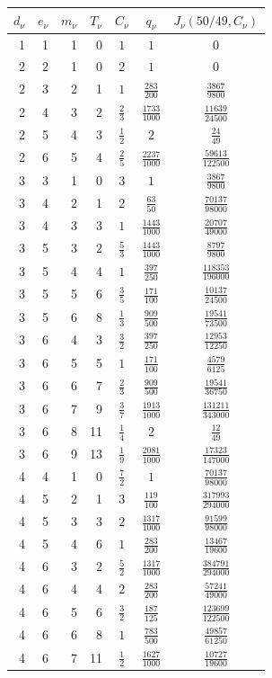 \begin{center}
\small
\begin{tabular}{rrrrccc}
\(d_\nu\)&\(e_\nu\)&\(m_\nu\)&\(T_\nu\)&\(C_\nu\)&\(q_\nu\)&
\(J_\nu(50/49,C_\nu)\)\\ \hline
1&1&1&0&\(1\)&\(1\)&\(0\)\\
2&2&1&0&\(2\)&\(1\)&\(0\)\\
2&3&2&1&\(1\)&\(\frac{283}{200}\)&\(\frac{3867}{9800}\)\\
2&4&3&2&\(\frac{2}{3}\)&\(\frac{1733}{1000}\)&\(\frac{11639}{24500}\)\\
2&5&4&3&\(\frac{1}{2}\)&\(2\)&\(\frac{24}{49}\)\\
2&6&5&4&\(\frac{2}{5}\)&\(\frac{2237}{1000}\)&\(\frac{59613}{122500}\)\\
3&3&1&0&\(3\)&\(1\)&\(\frac{3867}{9800}\)\\
3&4&2&1&\(2\)&\(\frac{63}{50}\)&\(\frac{70137}{98000}\)\\
3&4&3&3&\(1\)&\(\frac{1443}{1000}\)&\(\frac{20707}{49000}\)\\
3&5&3&2&\(\frac{5}{3}\)&\(\frac{1443}{1000}\)&\(\frac{8797}{9800}\)\\
3&5&4&4&\(1\)&\(\frac{397}{250}\)&\(\frac{118353}{196000}\)\\
3&5&5&6&\(\frac{3}{5}\)&\(\frac{171}{100}\)&\(\frac{10137}{24500}\)\\
3&5&6&8&\(\frac{1}{3}\)&\(\frac{909}{500}\)&\(\frac{19541}{73500}\)\\
3&6&4&3&\(\frac{3}{2}\)&\(\frac{397}{250}\)&\(\frac{12953}{12250}\)\\
3&6&5&5&\(1\)&\(\frac{171}{100}\)&\(\frac{4579}{6125}\)\\
3&6&6&7&\(\frac{2}{3}\)&\(\frac{909}{500}\)&\(\frac{19541}{36750}\)\\
3&6&7&9&\(\frac{3}{7}\)&\(\frac{1913}{1000}\)&\(\frac{131211}{343000}\)\\
3&6&8&11&\(\frac{1}{4}\)&\(2\)&\(\frac{12}{49}\)\\
3&6&9&13&\(\frac{1}{9}\)&\(\frac{2081}{1000}\)&\(\frac{17323}{147000}\)\\
4&4&1&0&\(\frac{7}{2}\)&\(1\)&\(\frac{70137}{98000}\)\\
4&5&2&1&\(3\)&\(\frac{119}{100}\)&\(\frac{317993}{294000}\)\\
4&5&3&3&\(2\)&\(\frac{1317}{1000}\)&\(\frac{91599}{98000}\)\\
4&5&4&6&\(1\)&\(\frac{283}{200}\)&\(\frac{13467}{19600}\)\\
4&6&3&2&\(\frac{5}{2}\)&\(\frac{1317}{1000}\)&\(\frac{384791}{294000}\)\\
4&6&4&4&\(2\)&\(\frac{283}{200}\)&\(\frac{57241}{49000}\)\\
4&6&5&6&\(\frac{3}{2}\)&\(\frac{187}{125}\)&\(\frac{123699}{122500}\)\\
4&6&6&8&\(1\)&\(\frac{783}{500}\)&\(\frac{49857}{61250}\)\\
4&6&7&11&\(\frac{1}{2}\)&\(\frac{1627}{1000}\)&\(\frac{10727}{19600}\)\\
\end{tabular}
\end{center}
